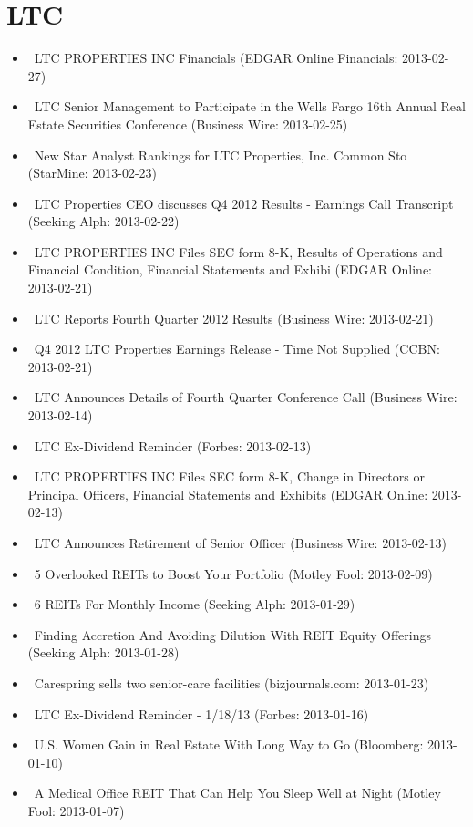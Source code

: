 \documentclass[11pt,asymmetric]{article}
\begin{document}
\section*{LTC}
\begin{itemize}
\item\ LTC PROPERTIES INC Financials (EDGAR Online Financials: 2013-02-27)
\item\ LTC Senior Management to Participate in the Wells Fargo 16th Annual Real Estate Securities Conference (Business Wire: 2013-02-25)
\item\ New Star Analyst Rankings for LTC Properties, Inc. Common Sto (StarMine: 2013-02-23)
\item\ LTC Properties CEO discusses Q4 2012 Results - Earnings Call Transcript (Seeking Alph: 2013-02-22)
\item\ LTC PROPERTIES INC Files SEC form 8-K, Results of Operations and Financial Condition, Financial Statements and Exhibi (EDGAR Online: 2013-02-21)
\item\ LTC Reports Fourth Quarter 2012 Results (Business Wire: 2013-02-21)
\item\ Q4 2012 LTC Properties Earnings Release - Time Not Supplied (CCBN: 2013-02-21)
\item\ LTC Announces Details of Fourth Quarter Conference Call (Business Wire: 2013-02-14)
\item\ LTC Ex-Dividend Reminder (Forbes: 2013-02-13)
\item\ LTC PROPERTIES INC Files SEC form 8-K, Change in Directors or Principal Officers, Financial Statements and Exhibits (EDGAR Online: 2013-02-13)
\item\ LTC Announces Retirement of Senior Officer (Business Wire: 2013-02-13)
\item\ 5 Overlooked REITs to Boost Your Portfolio (Motley Fool: 2013-02-09)
\item\ 6 REITs For Monthly Income (Seeking Alph: 2013-01-29)
\item\ Finding Accretion And Avoiding Dilution With REIT Equity Offerings (Seeking Alph: 2013-01-28)
\item\ Carespring sells two senior-care facilities (bizjournals.com: 2013-01-23)
\item\ LTC Ex-Dividend Reminder - 1/18/13 (Forbes: 2013-01-16)
\item\ U.S. Women Gain in Real Estate With Long Way to Go (Bloomberg: 2013-01-10)
\item\ A Medical Office REIT That Can Help You Sleep Well at Night (Motley Fool: 2013-01-07)

\end{itemize}
\end{document}
